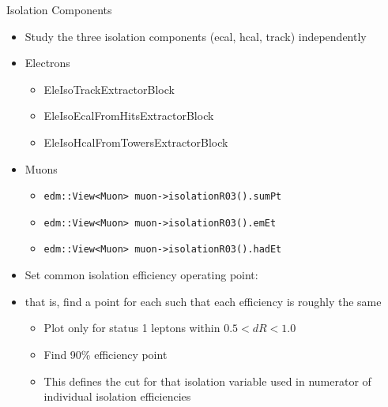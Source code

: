 \documentclass{beamer}
\begin{document}
\begin{frame}{Isolation Components}

  \begin{itemize}
  \item Study the three isolation components (ecal, hcal, track) independently
  \item Electrons
    \begin{itemize}
    \item \scriptsize{EleIsoTrackExtractorBlock}
    \item \scriptsize{EleIsoEcalFromHitsExtractorBlock}
    \item \scriptsize{EleIsoHcalFromTowersExtractorBlock}
    \end{itemize}
  \item Muons
    \begin{itemize}
    \item \scriptsize{\texttt{edm::View<Muon> muon->isolationR03().sumPt}}
    \item \texttt{edm::View<Muon> muon->isolationR03().emEt}
    \item \texttt{edm::View<Muon> muon->isolationR03().hadEt}
    \end{itemize}
  \item Set common isolation efficiency operating point: 
  \item that is, find a point for each such that each efficiency is roughly the same
    \begin{itemize}
    \item Plot only for status 1 leptons within $0.5 < dR < 1.0$
    \item Find 90\% efficiency point
    \item This defines the cut for that isolation variable used in numerator of individual isolation efficiencies
    \end{itemize}
  \end{itemize}
  
  
\end{frame}
\end{document}
